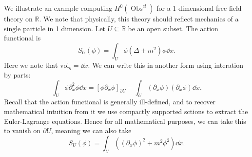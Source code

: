We illustrate an example computing $H^0(\operatorname{Obs} ^{cl} )$ for a 1-dimensional free field theory on $\mathbb{R} $. We note that physically, this theory should reflect mechanics of a single particle in 1 dimension. Let $U\subseteq \mathbb{R} $ be an open subset. The action functional is
\[
	S_U(\phi )=\int_{U} \phi (\Delta+m^2) \phi \dd x
.\]
Here we note that $\mathrm{vol} _g=\dd x$. We can write this in another form using interation by parts:
\[
	\int_{U} \phi \partial _x^2\phi \dd x = \left[\phi \partial _x\phi\right]_{\partial U}  - \int_{U} (\partial _x\phi)(\partial _x\phi )\dd x
.\]
Recall that the action functional is generally ill-defined, and to recover mathematical intuition from it we use compactly supported sctions to extract the Euler-Lagrange equations. Hence for all mathematical purposes, we can take this to vanish on $\partial U$, meaning we can also take
\[
	S_U(\phi ) = \int_{U}\left( (\partial _x\phi )^2 + m^2\phi ^2\right)\dd x
.\]


